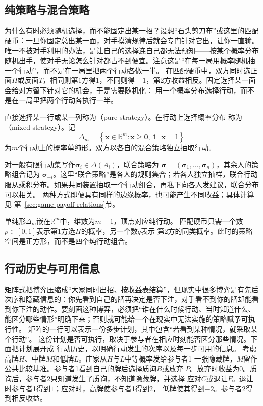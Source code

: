 \subsection{纯策略与混合策略}
\label{sec:game-pure-mixed}

为什么有时必须随机选择，而不能固定出某一招？设想“石头剪刀布”或这里的匹配硬币：一旦你固定总出某一面，对手摸清规律后就会专门针对它出，让你一直输。唯一不被对手利用的办法，是让自己的选择连自己都无法预知——按某个概率分布随机出手，使对手无论怎么针对都占不到便宜。注意这是“在每一局用概率随机抽一个行动”，而不是在一局里把两个行动各做一半。
在匹配硬币中，双方同时选正面\(H\)或反面\(T\)，相同则第1方得\(1\)，不同则得
\(-1\)，第2方收益相反。固定选择某一面会给对方留下针对它的机会，于是需要随机化：
用一个概率分布选择行动，而不是在一局里把两个行动各执行一半。
\begin{definition}[纯策略与混合策略]
\label{def:game-pure-mixed-strategy}
直接选择某一行或某一列称为（pure strategy）。在行动上选择概率分布
称为（mixed strategy）。记
\[
  \Delta_m
  =
  \left\{
    \bm{x}\in\mathbb{R}^m:
    \bm{x}\geq\bm{0},\
    \bm{1}^{\top}\bm{x}=1
  \right\}
\]
为\(m\)个行动上的概率单纯形。双方以各自的混合策略独立抽取行动。
\end{definition}

对一般有限行动集写作\(\bm\sigma_i\in\Delta(A_i)\)，联合策略为
\(\bm\sigma=(\bm\sigma_1,\ldots,\bm\sigma_n)\)，其余人的策略组合记为
\(\bm\sigma_{-i}\)。这里“联合策略”是各人的规则集合；若各人独立抽样，联合行动
服从乘积分布。如果共同装置抽取一个行动组合，再私下向各人发建议，联合分布可以相关。
两种方式即便具有同样的边缘概率，也可能产生不同收益；具体计算见
第~\ref{sec:game-payoff-relations}节。

单纯形\(\Delta_m\)嵌在\(\mathbb R^m\)中，维数为\(m-1\)，顶点对应纯行动。
匹配硬币只需一个数\(p\in[0,1]\)表示第1方选\(H\)的概率，另一个数\(q\)表示
第2方的同类概率。此时的策略空间是正方形，而不是四个纯行动组合。

\subsection{行动历史与可用信息}
\label{sec:game-extensive-information}

矩阵式把博弈压缩成“大家同时出招、按收益表结算”，但现实中很多博弈是有先后次序和隐藏信息的：你先看到自己的牌再决定是否下注，对手看不到你的牌却能看到你下注的动作。要刻画这种博弈，必须把“谁在什么时候行动、当时知道什么、能区分哪些情形”明确下来；否则就可能给一个在现实中无法实施的策略赋予可执行性。
矩阵的一行可以表示一份多步计划，其中包含“若看到某种情况，就采取某个行动”。
这份计划是否可执行，取决于参与者在相应时刻能否区分那些情况。下面把计划展开成
行动历史，以明确行动发生的次序以及每一步可用的信息。
考虑高牌\(H\)、中牌\(M\)和低牌\(L\)。庄家从\(H\)与\(L\)中等概率发给参与者1
一张隐藏牌，\(M\)留作公共比较基准。参与者1看到自己的牌后选择质询\(B\)或放弃
\(P\)。放弃时收益为\(0\)。质询后，参与者2只知道发生了质询，不知道隐藏牌，并选择
应对\(C\)或退让\(F\)。退让时参与者1得到\(1\)；应对时，高牌使参与者1得到\(2\)，
低牌使其得到\(-2\)。参与者2得到相反收益。

